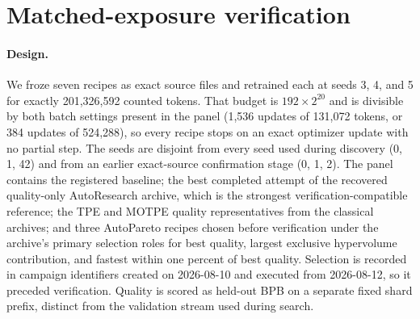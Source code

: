 \documentclass{article}
\begin{document}
\section{Matched-exposure verification}\label{sec:verify}
\paragraph{Design.} We froze seven recipes as exact source files and retrained each at seeds 3, 4, and 5 for exactly 201,326,592 counted tokens. That budget is $192\times2^{20}$ and is divisible by both batch settings present in the panel (1{,}536 updates of 131{,}072 tokens, or 384 updates of 524{,}288), so every recipe stops on an exact optimizer update with no partial step. The seeds are disjoint from every seed used during discovery (0, 1, 42) and from an earlier exact-source confirmation stage (0, 1, 2). The panel contains the registered baseline; the best completed attempt of the recovered quality-only AutoResearch archive, which is the strongest verification-compatible reference; the TPE and MOTPE quality representatives from the classical archives; and three AutoPareto recipes chosen before verification under the archive's primary selection roles for best quality, largest exclusive hypervolume contribution, and fastest within one percent of best quality. Selection is recorded in campaign identifiers created on 2026-08-10 and executed from 2026-08-12, so it preceded verification. Quality is scored as held-out BPB on a separate fixed shard prefix, distinct from the validation stream used during search.

\begin{table}[t]
\caption{Discovery-stage exposure and matched-exposure verification. The two discovery columns come from each recipe's originating archive attempt under the 300-second contract, where exposure varied by design. The remaining columns come from retraining the frozen recipe at exactly 201,326,592 counted tokens on seeds 3, 4, and 5, and are means over those three seeds; SD is the sample standard deviation of held-out BPB. Decode is cached-decode tokens/s, MiB is peak allocated inference memory, KV MiB is measured incremental KV-cache memory, and steady seconds is a sustained-rate training estimate from timed post-warm-up updates rather than end-to-end runtime. Memory and KV are deterministic for this workload and identical across all repetitions and seeds.}\label{tab:main}
\centering\small
\end{table}
\end{document}
